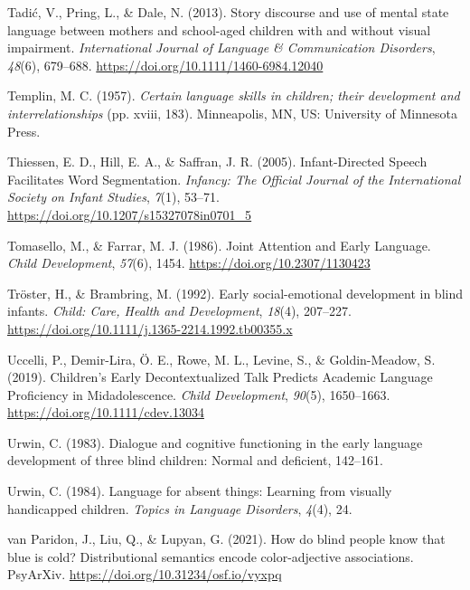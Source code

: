 \documentclass[
  man]{apa6}
\newlength{\cslhangindent}
\newlength{\cslentryspacingunit} %
\newenvironment{CSLReferences}[2] %
 {%
  \setlength{\parindent}{0pt}
  \ifodd #1
  \let\oldpar\par
  \def\par{\hangindent=\cslhangindent\oldpar}
  \fi
  \setlength{\parskip}{#2\cslentryspacingunit}
 }%
 {}
\begin{document}
\begin{CSLReferences}{1}{0}
\leavevmode{}%
Tadić, V., Pring, L., \& Dale, N. (2013). Story discourse and use of mental state language between mothers and school-aged children with and without visual impairment. \emph{International Journal of Language \& Communication Disorders}, \emph{48}(6), 679--688. \url{https://doi.org/10.1111/1460-6984.12040}

\leavevmode{}%
Templin, M. C. (1957). \emph{Certain language skills in children; their development and interrelationships} (pp. xviii, 183). {Minneapolis, MN, US}: {University of Minnesota Press}.

\leavevmode{}%
Thiessen, E. D., Hill, E. A., \& Saffran, J. R. (2005). Infant-{Directed Speech Facilitates Word Segmentation}. \emph{Infancy: The Official Journal of the International Society on Infant Studies}, \emph{7}(1), 53--71. \url{https://doi.org/10.1207/s15327078in0701_5}

\leavevmode{}%
Tomasello, M., \& Farrar, M. J. (1986). Joint {Attention} and {Early Language}. \emph{Child Development}, \emph{57}(6), 1454. \url{https://doi.org/10.2307/1130423}

\leavevmode{}%
Tröster, H., \& Brambring, M. (1992). Early social-emotional development in blind infants. \emph{Child: Care, Health and Development}, \emph{18}(4), 207--227. \url{https://doi.org/10.1111/j.1365-2214.1992.tb00355.x}

\leavevmode{}%
Uccelli, P., Demir-Lira, Ö. E., Rowe, M. L., Levine, S., \& Goldin-Meadow, S. (2019). Children's {Early Decontextualized Talk Predicts Academic Language Proficiency} in {Midadolescence}. \emph{Child Development}, \emph{90}(5), 1650--1663. \url{https://doi.org/10.1111/cdev.13034}

\leavevmode{}%
Urwin, C. (1983). Dialogue and cognitive functioning in the early language development of three blind children: {Normal} and deficient, 142--161.

\leavevmode{}%
Urwin, C. (1984). Language for absent things: Learning from visually handicapped children. \emph{Topics in Language Disorders}, \emph{4}(4), 24.

\leavevmode{}%
van Paridon, J., Liu, Q., \& Lupyan, G. (2021). How do blind people know that blue is cold? {Distributional} semantics encode color-adjective associations. {PsyArXiv}. \url{https://doi.org/10.31234/osf.io/vyxpq}


\end{CSLReferences}
\end{document}
